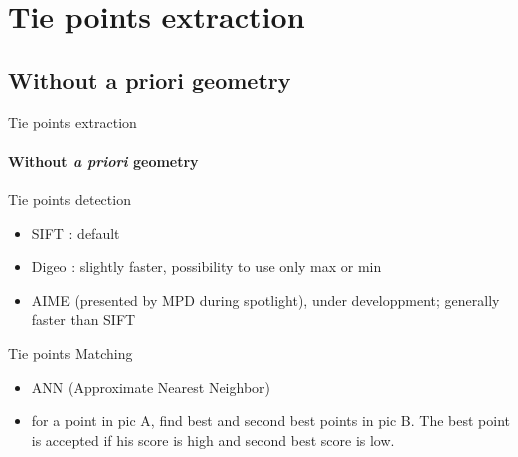 \documentclass{beamer}
\begin{document}
\section{Tie points extraction}
\subsection{Without a priori geometry}
        \begin{frame}{Tie points extraction }
                \framesubtitle{Without \textit{a priori} geometry}
\pause
                \begin{block}{Tie points detection}
                        \begin{itemize}
                        \item SIFT : default
                        \item Digeo : slightly faster, possibility to use only max or min
                        \item AIME (presented by MPD during spotlight), under developpment; generally faster than SIFT
                        \end{itemize}
                \end{block}
\pause
                \begin{block}{Tie points Matching}
                \begin{itemize}
                        \item ANN (Approximate Nearest Neighbor)
                        \item for a point in pic A, find best and second best points in pic B.
                        The best point is accepted if his score is high and second best score is low.
                        \end{itemize}
                \end{block}
                
        \end{frame}
        
\end{document}
